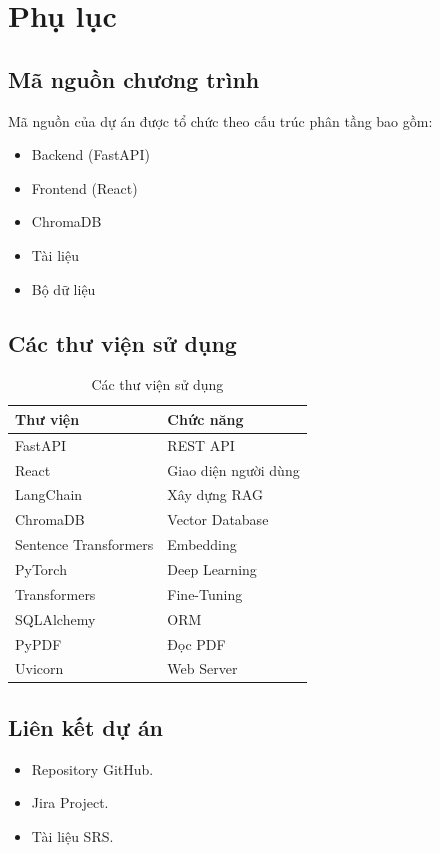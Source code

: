 \chapter{Phụ lục}
\section{Mã nguồn chương trình}

Mã nguồn của dự án được tổ chức theo cấu trúc phân tầng bao gồm:

\begin{itemize}
	\item Backend (FastAPI)
	\item Frontend (React)
	\item ChromaDB
	\item Tài liệu
	\item Bộ dữ liệu
\end{itemize}
\section{Các thư viện sử dụng}

\begin{table}[H]
	\centering
	\begin{tabular}{|l|l|}
		\hline
		Thư viện & Chức năng\\
		\hline
		FastAPI & REST API\\
		React & Giao diện người dùng\\
		LangChain & Xây dựng RAG\\
		ChromaDB & Vector Database\\
		Sentence Transformers & Embedding\\
		PyTorch & Deep Learning\\
		Transformers & Fine-Tuning\\
		SQLAlchemy & ORM\\
		PyPDF & Đọc PDF\\
		Uvicorn & Web Server\\
		\hline
	\end{tabular}
	\caption{Các thư viện sử dụng}
\end{table}

\section{Liên kết dự án}

\begin{itemize}
	\item Repository GitHub.
	\item Jira Project.
	\item Tài liệu SRS.
\end{itemize}

